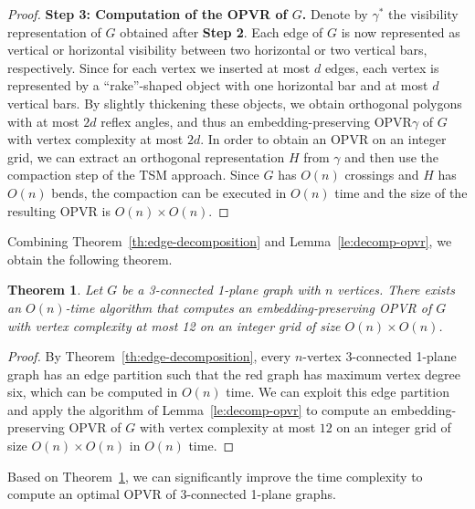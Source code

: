 \documentclass{article}
\newtheorem{theorem}{Theorem}
\newcommand{\opvr}{OPVR\xspace}
\begin{document}
\begin{proof}
\smallskip\noindent\textbf{Step 3: Computation of the \opvr of $G$.} Denote by $\gamma^*$ the visibility representation of $G$ obtained after {\bf Step 2}. Each edge of $G$ is now represented as vertical or horizontal visibility between two horizontal or two vertical bars, respectively. Since for each vertex we inserted at most $d$  edges, each vertex is represented by a ``rake''-shaped object with one horizontal bar and at most $d$ vertical bars. By slightly thickening these objects, we obtain orthogonal polygons with at most $2d$ reflex angles, and thus an embedding-preserving \opvr $\gamma$ of $G$ with vertex complexity at most $2d$. In order to obtain an \opvr on an integer grid, we can extract an orthogonal representation $H$ from $\gamma$ and then use the compaction step of the TSM approach. Since $G$ has $O(n)$ crossings and $H$ has $O(n)$ bends, the compaction can be executed in $O(n)$ time and the size of the resulting \opvr is $O(n) \times O(n)$.
\end{proof}

Combining Theorem~\ref{th:edge-decomposition} and Lemma~\ref{le:decomp-opvr}, we obtain the following theorem.

\begin{theorem}\label{th:decomp-opvr}
Let $G$ be a 3-connected 1-plane graph with $n$ vertices. There exists an $O(n)$-time algorithm that computes an embedding-preserving \opvr of $G$ with vertex complexity at most 12 on an integer grid of size $O(n) \times O(n)$.
\end{theorem}
\begin{proof}
By Theorem~\ref{th:edge-decomposition}, every $n$-vertex 3-connected 1-plane graph has an edge partition such that the red graph has maximum vertex degree six, which can be computed in $O(n)$ time. We can exploit this edge partition and apply the algorithm of Lemma~\ref{le:decomp-opvr} to compute an embedding-preserving \opvr of $G$ with vertex complexity at most $12$ on an integer grid of size $O(n)\times O(n)$ in $O(n)$ time.
\end{proof}

Based on Theorem~\ref{th:decomp-opvr}, we can significantly improve the time complexity to compute an optimal \opvr of 3-connected 1-plane graphs.
\end{document}
